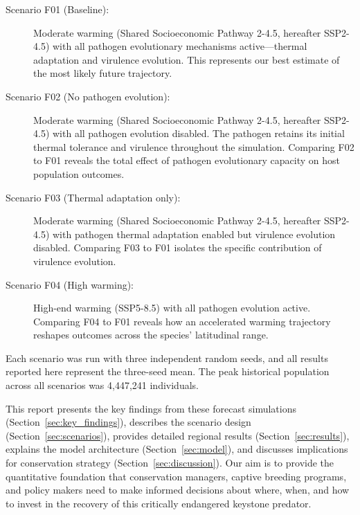 \begin{description}
    \item[Scenario F01 (Baseline):] Moderate warming (Shared Socioeconomic Pathway 2-4.5, hereafter SSP2-4.5) with all pathogen
    evolutionary mechanisms active---thermal adaptation and virulence evolution.
    This represents our best estimate of the most likely future trajectory.

    \item[Scenario F02 (No pathogen evolution):] Moderate warming (Shared Socioeconomic Pathway 2-4.5, hereafter SSP2-4.5) with
    all pathogen evolution disabled. The pathogen retains its initial thermal
    tolerance and virulence throughout the simulation. Comparing F02 to F01 reveals
    the total effect of pathogen evolutionary capacity on host population outcomes.

    \item[Scenario F03 (Thermal adaptation only):] Moderate warming (Shared Socioeconomic Pathway 2-4.5, hereafter SSP2-4.5)
    with pathogen thermal adaptation enabled but virulence evolution disabled.
    Comparing F03 to F01 isolates the specific contribution of virulence evolution.

    \item[Scenario F04 (High warming):] High-end warming (SSP5-8.5) with all
    pathogen evolution active. Comparing F04 to F01 reveals how an accelerated
    warming trajectory reshapes outcomes across the species' latitudinal range.
\end{description}

Each scenario was run with three independent random seeds, and all results reported
here represent the three-seed mean. The peak historical population across all
scenarios was 4,447,241 individuals.

This report presents the key findings from these forecast simulations (Section~\ref{sec:key_findings}), describes the scenario design (Section~\ref{sec:scenarios}), provides detailed regional results (Section~\ref{sec:results}), explains the model architecture (Section~\ref{sec:model}), and discusses implications for conservation strategy (Section~\ref{sec:discussion}). Our aim is to provide the quantitative foundation
that conservation managers, captive breeding programs, and policy makers need to
make informed decisions about where, when, and how to invest in the recovery of
this critically endangered keystone predator.
